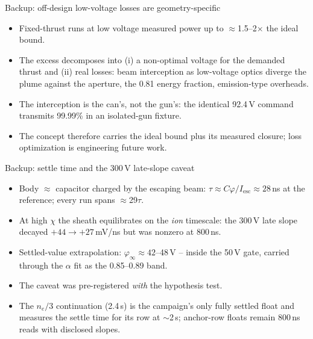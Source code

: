 \documentclass[10pt,aspectratio=169]{beamer}
\begin{document}
\appendix
\begin{frame}{Backup: off-design low-voltage losses are geometry-specific}
  \begin{itemize}\small
    \item Fixed-thrust runs at low voltage measured power up to
          $\approx$1.5--2$\times$ the ideal bound.
    \item The excess decomposes into (i) a non-optimal voltage for the
          demanded thrust and (ii) real losses: beam interception as
          low-voltage optics diverge the plume against the aperture, the
          0.81 energy fraction, emission-type overheads.
    \item The interception is the can's, not the gun's: the identical
          92.4\,V command transmits 99.99\% in an isolated-gun fixture.
    \item The concept therefore carries the ideal bound plus its measured
          closure; loss optimization is engineering future work.
  \end{itemize}
\end{frame}

\begin{frame}{Backup: settle time and the 300\,V late-slope caveat}
  \begin{itemize}\small
    \item Body $\approx$ capacitor charged by the escaping beam:
          $\tau \approx C\varphi/I_{\mathrm{esc}} \approx 28$\,ns at the
          reference; every run spans $\approx$29$\tau$.
    \item At high $\chi$ the sheath equilibrates on the \emph{ion}
          timescale: the 300\,V late slope decayed $+44 \to +27$\,mV/ns but
          was nonzero at 800\,ns.
    \item Settled-value extrapolation: $\varphi_\infty \approx 42$--48\,V --
          inside the 50\,V gate, carried through the $\alpha$ fit as the
          0.85--0.89 band.
    \item The caveat was pre-registered \emph{with} the hypothesis test.
    \item The $n_e/3$ continuation (2.4\,\textmu s) is the campaign's only
          fully settled float and measures the settle time for its row at
          $\sim$2\,\textmu s; anchor-row floats remain 800\,ns reads with
          disclosed slopes.
  \end{itemize}
\end{frame}
\end{document}
